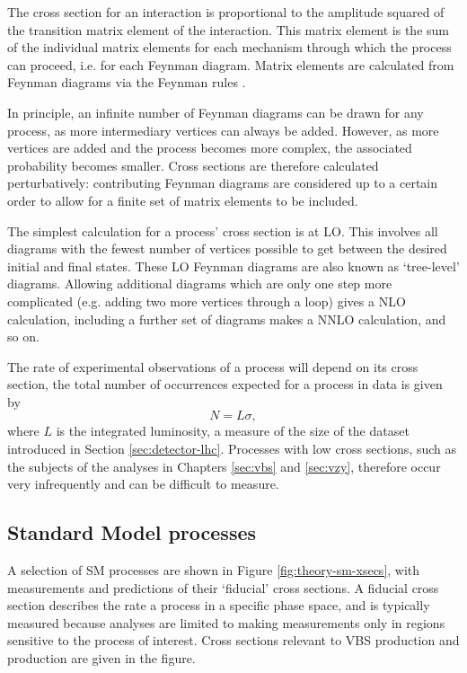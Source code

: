 The cross section for an interaction is proportional to the amplitude squared of
the transition matrix element of the interaction. This matrix element is the
sum of the individual matrix elements for each mechanism through which the
process can proceed, i.e. for each Feynman diagram. Matrix elements are
calculated from Feynman diagrams via the Feynman rules \cite{Feynman1949}.

In principle, an infinite number of Feynman diagrams can be drawn for any
process, as more intermediary vertices can always be added. However, as more
vertices are added and the process becomes more complex, the associated
probability becomes smaller. Cross sections are therefore calculated
perturbatively: contributing Feynman diagrams are considered up to a certain
order to allow for a finite set of matrix elements to be included.

The simplest calculation for a process' cross section is at \ac{LO}. This involves all diagrams with the
fewest number of vertices possible to get between the desired initial and final
states. These \ac{LO} Feynman diagrams are also known as `tree-level' diagrams.
Allowing additional diagrams which are only one step more complicated (e.g.
adding two more vertices through a loop) gives a \ac{NLO} calculation, including
a further set of diagrams makes a \ac{NNLO} calculation, and so on.

The rate of experimental observations of a process will depend on its cross
section, the total number of occurrences expected for a process in data is given
by
\begin{equation*}
  N = L\sigma,
\end{equation*}
where $L$ is the integrated luminosity, a measure of the size of the dataset
introduced in Section \ref{sec:detector-lhc}. Processes with low cross sections,
such as the subjects of the analyses in Chapters \ref{sec:vbs} and
\ref{sec:vzy}, therefore occur very infrequently and can be difficult to
measure.

\subsection{Standard Model processes}

A selection of \ac{SM} processes are shown in Figure \ref{fig:theory-sm-xsecs},
with measurements and predictions of their `fiducial' cross sections.  A
fiducial cross section describes the rate a process in a specific phase space,
and is typically measured because analyses are limited to making measurements
only in regions sensitive to the process of interest. Cross sections relevant to
\ac{VBS} \Zy production and \VZy production are given in the figure.

